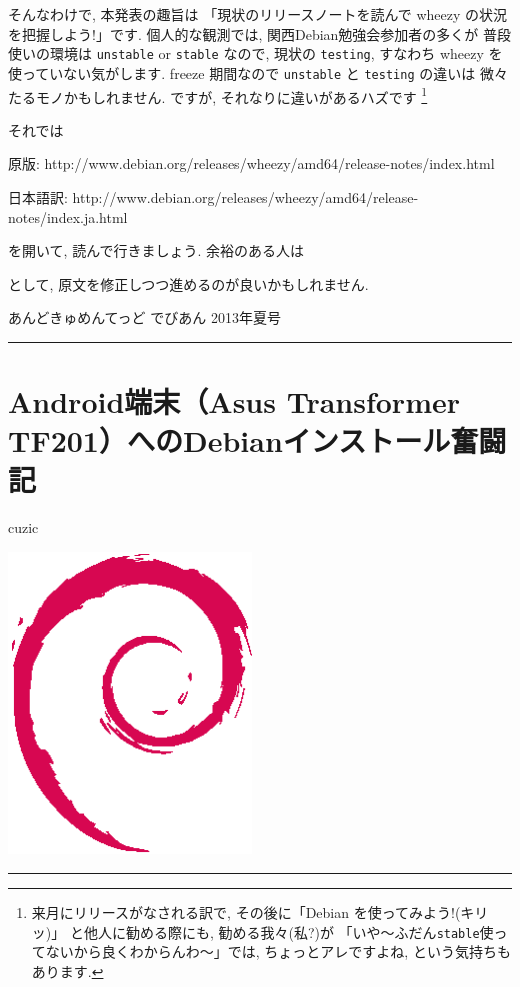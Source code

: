 \documentclass[mingoth,a4paper]{jsarticle}
\renewcommand{\dancersection}[2]{%
\newpage
あんどきゅめんてっど でびあん 2013年夏号
%
\vspace{0.1mm}\\
{\color{dancerdarkblue}\rule{\hsize}{2mm}}

%
%
\begin{minipage}[t]{0.6\hsize}
\color{dancerdarkblue}
\vspace{1cm}
\section{#1}
\hfill{}#2\\
\end{minipage}
\begin{minipage}[t]{0.4\hsize}
\vspace{-2cm}
\hfill{}\includegraphics[height=8cm]{image200502/openlogo-nd.eps}\\
\vspace{-5cm}
\end{minipage}
%
{\color{dancerlightblue}\rule{0.66\hsize}{2mm}}
%
\vspace{2cm}
}
\begin{document}
そんなわけで, 本発表の趣旨は
「現状のリリースノートを読んで wheezy の状況を把握しよう!」です.
%
個人的な観測では, 関西Debian勉強会参加者の多くが
普段使いの環境は \texttt{unstable} or \texttt{stable} なので,
現状の \texttt{testing}, すなわち wheezy を使っていない気がします.
%
freeze 期間なので \texttt{unstable} と \texttt{testing} の違いは
微々たるモノかもしれません.
%
ですが, それなりに違いがあるハズです
\footnote{%
  来月にリリースがなされる訳で, その後に「Debian を使ってみよう!(キリッ)」
  と他人に勧める際にも, 勧める我々(私?)が
  「いや〜ふだん\texttt{stable}使ってないから良くわからんわ〜」では,
  ちょっとアレですよね, という気持ちもあります.
}

それでは
\begin{commandline}
  原版:
  http://www.debian.org/releases/wheezy/amd64/release-notes/index.html

  日本語訳:
  http://www.debian.org/releases/wheezy/amd64/release-notes/index.ja.html
\end{commandline}
\noindent
を開いて, 読んで行きましょう.
余裕のある人は
\noindent
として, 原文を修正しつつ進めるのが良いかもしれません.

\clearpage

\dancersection{Android端末（Asus Transformer TF201）へのDebianインストール奮闘記}{cuzic}
\end{document}
